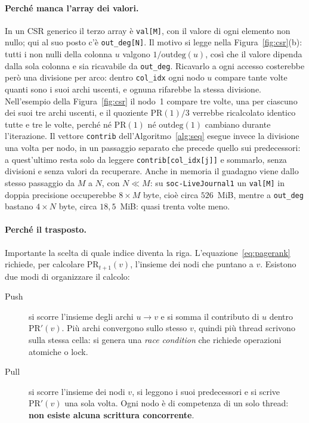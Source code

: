 \documentclass[11pt,a4paper]{article}
\begin{document}
\paragraph{Perché manca l'array dei valori.}
In un CSR generico il terzo array è \texttt{val[M]}, con il valore di ogni
elemento non nullo; qui al suo posto c'è \texttt{out\_deg[N]}. Il motivo si
legge nella Figura~\ref{fig:csr}(b): tutti i non nulli della colonna $u$
valgono $1/\mathrm{outdeg}(u)$, così che il valore dipenda dalla sola colonna
e sia ricavabile da \texttt{out\_deg}.
Ricavarlo a ogni accesso costerebbe però una divisione per arco: dentro
\texttt{col\_idx} ogni nodo $u$ compare tante volte quanti sono i suoi archi
uscenti, e ognuna rifarebbe la stessa divisione. Nell'esempio della
Figura~\ref{fig:csr} il nodo~1 compare tre volte, una per ciascuno dei suoi
tre archi uscenti, e il quoziente $\mathrm{PR}(1)/3$ verrebbe ricalcolato
identico tutte e tre le volte, perché né $\mathrm{PR}(1)$ né
$\mathrm{outdeg}(1)$ cambiano durante l'iterazione. Il vettore
\texttt{contrib} dell'Algoritmo~\ref{alg:seq} esegue invece la divisione una
volta per nodo, in un passaggio separato che precede quello sui predecessori:
a quest'ultimo resta solo da leggere \texttt{contrib[col\_idx[j]]} e
sommarlo, senza divisioni e senza valori da recuperare. Anche in memoria il
guadagno viene dallo stesso passaggio da $M$ a $N$, con $N \ll M$: su
\texttt{soc-LiveJournal1} un \texttt{val[M]} in doppia precisione occuperebbe
$8 \times M$ byte, cioè circa $526$~MiB, mentre a \texttt{out\_deg} bastano
$4 \times N$ byte, circa $18{,}5$~MiB: quasi trenta volte meno.

\paragraph{Perché il trasposto.}
Importante la scelta di quale indice diventa la riga.
L'equazione~\eqref{eq:pagerank} richiede, per calcolare
$\mathrm{PR}_{t+1}(v)$, l'insieme dei nodi che puntano a $v$. Esistono due modi di
organizzare il calcolo:

\begin{description}
  \item[Push] si scorre l'insieme degli archi $u \to v$ e si somma il
    contributo di $u$ dentro $\mathrm{PR}'(v)$. Più archi convergono sullo stesso
    $v$, quindi più thread scrivono sulla stessa cella: si genera una
    \emph{race condition} che richiede operazioni atomiche o lock.
  \item[Pull] si scorre l'insieme dei nodi $v$, si leggono i suoi
    predecessori e si scrive $\mathrm{PR}'(v)$ una sola volta. Ogni nodo è di
    competenza di un solo thread: \textbf{non esiste alcuna scrittura
    concorrente}.
\end{description}
\end{document}
